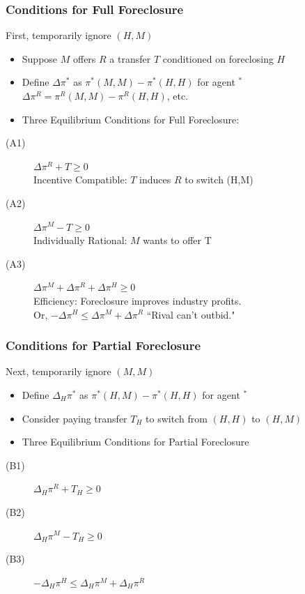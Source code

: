 \begin{frame}
\frametitle{Conditions for Full Foreclosure}
First, temporarily ignore $(H,M)$
\begin{itemize}
\item Suppose $M$ offers $R$ a transfer $T$ conditioned on foreclosing $H$
\item Define $\Delta \pi^{*}$ as $\pi^*(M,M) - \pi^*(H,H)$ for agent $ ^*$ \\ 
\hspace{0.4in} $\Delta \pi^{R} = \pi^R(M,M) - \pi^R(H,H)$, etc.
\item Three Equilibrium Conditions for Full Foreclosure:
\end{itemize}
\begin{description}
\item[(A1)] $\Delta \pi^R+ T \geq 0$\\
 Incentive Compatible: $T$ induces $R$ to switch (H,M)
\item[(A2)] $\Delta \pi^M - T \geq 0$\\
Individually Rational: $M$ wants to offer T
\item[(A3)] $\Delta \pi^M + \Delta \pi^R + \Delta \pi^H \geq 0$\\
Efficiency: Foreclosure improves industry profits.\\
Or, $-\Delta\pi^H \leq \Delta \pi^M + \Delta \pi^R$ ``Rival can't outbid." 
\end{description}
\end{frame}

\begin{frame}
\frametitle{Conditions for Partial Foreclosure}
Next, temporarily ignore $(M,M)$
\begin{itemize}
\item Define $\Delta_H \pi^{*}$ as $\pi^*(H,M) - \pi^*(H,H)$ for agent $ ^*$ 
\item Consider paying transfer $T_H$ to switch from $(H,H)$ to $(H,M)$
\item Three Equilibrium Conditions for Partial Foreclosure
\end{itemize}
\begin{description}
\item[(B1)] $\Delta_H \pi^R+ T_H \geq 0$
\item[(B2)] $\Delta_H \pi^M - T_H \geq 0$
\item[(B3)]$-\Delta_H\pi^H \leq \Delta_H \pi^M + \Delta_H \pi^R$
\end{description}
\end{frame}


